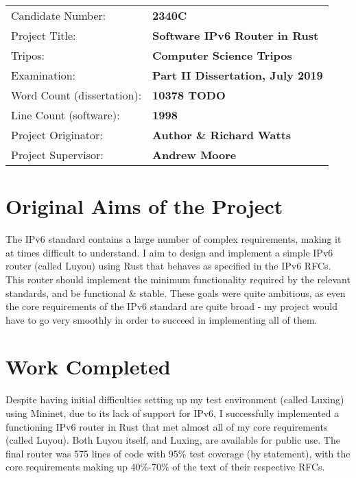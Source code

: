 \documentclass[12pt,a4paper,twoside,openany]{report}
\begin{document}
{\large
\begin{tabular}{ll}
Candidate Number:          & \bf 2340C                      \\
Project Title:             & \bf Software IPv6 Router in Rust \\
Tripos:                    & \bf Computer Science Tripos  \\
Examination:               & \bf Part II Dissertation, July 2019  \\
Word Count (dissertation): & \bf 10378 TODO\footnotemark[1]  \\
Line Count (software):     & \bf 1998 \footnotemark[2] \\
Project Originator:        & \bf Author \& Richard Watts \\
Project Supervisor:        & \bf Andrew Moore \\
\end{tabular}
}



\section*{Original Aims of the Project}

The IPv6 standard\cite{ipv6_rfc} contains a large number of complex requirements, making it at times difficult to understand. I aim to design and implement a simple IPv6 router (called Luyou) using Rust\cite{rust} that behaves as specified in the IPv6 RFCs. This router should implement the minimum functionality required by the relevant standards, and be functional \&  stable.  These goals were quite ambitious, as even the core requirements of the IPv6 standard are quite broad - my project would have to go very smoothly in order to succeed in implementing all of them.

\section*{Work Completed}

Despite having initial difficulties setting up my test environment (called Luxing) using Mininet\cite{mininet}, due to its lack of support for IPv6, I successfully implemented a functioning IPv6 router in Rust that met almost all of my core requirements (called Luyou). Both Luyou itself, and Luxing, are available for public use\cite{repo}.  The final router was 575 lines of code with 95\% test coverage (by statement), with the core requirements making up 40\%-70\% of the text of their respective RFCs. 
\end{document}
